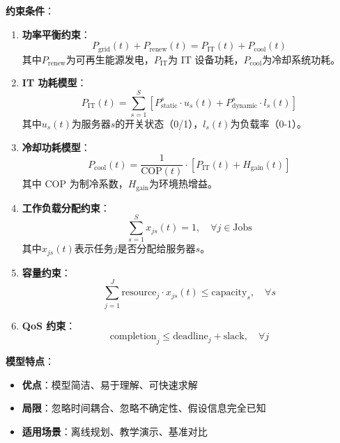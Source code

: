 \documentclass[12pt,a4paper]{article}
\begin{document}
\textbf{约束条件}：

\begin{enumerate}
    \item \textbf{功率平衡约束}：
    \begin{equation}
    P_{\text{grid}}(t) + P_{\text{renew}}(t) = P_{\text{IT}}(t) + P_{\text{cool}}(t)
    \label{eq:power-balance}
    \end{equation}
    其中$P_{\text{renew}}$为可再生能源发电，$P_{\text{IT}}$为 IT 设备功耗，$P_{\text{cool}}$为冷却系统功耗。
    
    \item \textbf{IT 功耗模型}：
    \begin{equation}
    P_{\text{IT}}(t) = \sum_{s=1}^{S} \left[ P_{\text{static}}^s \cdot u_s(t) + P_{\text{dynamic}}^s \cdot l_s(t) \right]
    \label{eq:it-power}
    \end{equation}
    其中$u_s(t)$为服务器$s$的开关状态（0/1），$l_s(t)$为负载率（0-1）。
    
    \item \textbf{冷却功耗模型}：
    \begin{equation}
    P_{\text{cool}}(t) = \frac{1}{\text{COP}(t)} \cdot \left[ P_{\text{IT}}(t) + H_{\text{gain}}(t) \right]
    \label{eq:cool-power}
    \end{equation}
    其中 COP 为制冷系数，$H_{\text{gain}}$为环境热增益。
    
    \item \textbf{工作负载分配约束}：
    \begin{equation}
    \sum_{s=1}^{S} x_{js}(t) = 1, \quad \forall j \in \text{Jobs}
    \label{eq:workload-assign}
    \end{equation}
    其中$x_{js}(t)$表示任务$j$是否分配给服务器$s$。
    
    \item \textbf{容量约束}：
    \begin{equation}
    \sum_{j=1}^{J} \text{resource}_j \cdot x_{js}(t) \leq \text{capacity}_s, \quad \forall s
    \label{eq:capacity}
    \end{equation}
    
    \item \textbf{QoS 约束}：
    \begin{equation}
    \text{completion}_j \leq \text{deadline}_j + \text{slack}, \quad \forall j
    \label{eq:qos}
    \end{equation}
\end{enumerate}

\textbf{模型特点}：
\begin{itemize}
    \item \textbf{优点}：模型简洁、易于理解、可快速求解
    \item \textbf{局限}：忽略时间耦合、忽略不确定性、假设信息完全已知
    \item \textbf{适用场景}：离线规划、教学演示、基准对比
\end{itemize}
\end{document}
